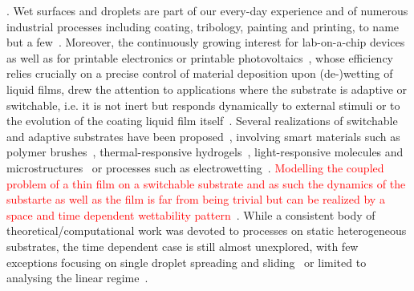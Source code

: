 \documentclass[amsmath,amssymb,showpacs,prf,superscriptaddress, longbibliography]{revtex4-1} %
\newcommand{\REV}[1]{\textcolor{red}{#1}}
\begin{document}
\maketitle

\newcommand{\ts}{\textsuperscript}

. Wet surfaces and droplets are part of our every-day experience and of numerous industrial processes including coating, tribology, painting and printing, to name but a few~\cite{grossFluidFilmLubrication1980a,szeriFluidFilmLubrication2010,quereFluidCoatingFiber1999,dasilvasobrinhoStudyDefectsUltrathin1999,singhInkjetPrintingProcess2010,wijshoffDynamicsPiezoInkjet2010}. 
Moreover, the continuously growing interest for lab-on-a-chip devices~\cite{samieiReviewDigitalMicrofluidics2016,fockeLabonaFoilMicrofluidicsThin2010} as well as for printable electronics or printable photovoltaics~\cite{luechingerGraphenestabilizedCopperNanoparticles2008,ronsinFormationCrystallineBulk2022}, whose efficiency relies crucially on a precise control of material deposition upon (de-)wetting of liquid films, drew the attention to applications where the substrate is adaptive or switchable, i.e. it is not inert but responds dynamically to external stimuli or to the evolution of the coating liquid film itself~\cite{buttAdaptiveWettingAdaptation2018}. 
Several realizations of switchable and adaptive substrates have been proposed~\cite{xinReversiblySwitchableWettability2010}, involving smart materials such as polymer brushes~\cite{stuartEmergingApplicationsStimuliresponsive2010}, thermal-responsive hydrogels~\cite{chenThermalresponsiveHydrogelSurface2010}, light-responsive molecules and microstructures~\cite{ichimuraLightDrivenMotionLiquids2000} or processes such as electrowetting~\cite{mugeleElectrowettingConvenientWay2005}.
\REV{Modelling the coupled problem of a thin film on a switchable substrate and as such the dynamics of the substarte as well as the film is far from being trivial but can be realized by a space and time dependent wettability pattern~\cite{grawitterSteeringDropletsSubstrates2021}}. 
While a consistent body of theoretical/computational work was devoted to processes on static heterogeneous substrates, the time dependent case is still almost unexplored, with few exceptions focusing on single droplet spreading and sliding~\cite{grawitterSteeringDropletsSubstrates2021,grawitterDropletsSubstratesOscillating2021,thieleGradientDynamicsModel2020} or limited to analysing the linear regime~\cite{sumanDynamicsThinLiquid2006}.
\end{document}
